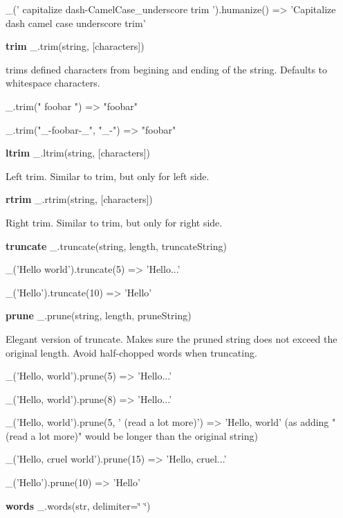 \begin{DoxyCode}
\_('  capitalize dash-CamelCase\_underscore trim  ').humanize()
=> 'Capitalize dash camel case underscore trim'
\end{DoxyCode}


{\bfseries trim} \+\_\+.\+trim(string, \mbox{[}characters\mbox{]})

trims defined characters from begining and ending of the string. Defaults to whitespace characters.


\begin{DoxyCode}
\_.trim("  foobar   ")
=> "foobar"

\_.trim("\_-foobar-\_", "\_-")
=> "foobar"
\end{DoxyCode}


{\bfseries ltrim} \+\_\+.\+ltrim(string, \mbox{[}characters\mbox{]})

Left trim. Similar to trim, but only for left side.

{\bfseries rtrim} \+\_\+.\+rtrim(string, \mbox{[}characters\mbox{]})

Right trim. Similar to trim, but only for right side.

{\bfseries truncate} \+\_\+.\+truncate(string, length, truncate\+String)


\begin{DoxyCode}
\_('Hello world').truncate(5)
=> 'Hello...'

\_('Hello').truncate(10)
=> 'Hello'
\end{DoxyCode}


{\bfseries prune} \+\_\+.\+prune(string, length, prune\+String)

Elegant version of truncate. Makes sure the pruned string does not exceed the original length. Avoid half-\/chopped words when truncating.


\begin{DoxyCode}
\_('Hello, world').prune(5)
=> 'Hello...'

\_('Hello, world').prune(8)
=> 'Hello...'

\_('Hello, world').prune(5, ' (read a lot more)')
=> 'Hello, world' (as adding "(read a lot more)" would be longer than the original string)

\_('Hello, cruel world').prune(15)
=> 'Hello, cruel...'

\_('Hello').prune(10)
=> 'Hello'
\end{DoxyCode}


{\bfseries words} \+\_\+.\+words(str, delimiter=\char`\"{} \char`\"{})


